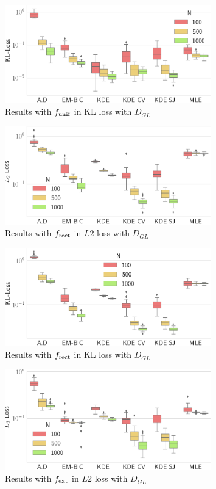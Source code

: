 \begin{figure}
\center
    \includegraphics[width=0.8\textwidth]{./TeX_files/res_uniform_KL_GL.png}
    \caption{Results with $f_{\textnormal{unif}}$ in KL loss with $D_{GL}$}
    \label{fig:res_uniform_KL_GL}
\end{figure}
\begin{figure}
\center
    \includegraphics[width=0.8\textwidth]{./TeX_files/res_rect_L2_GL.png}
    \caption{Results with $f_{\textnormal{rect}}$ in $L2$ loss with $D_{GL}$}
    \label{fig:res_rect_L2_GL}
\end{figure}

\begin{figure}
\center
    \includegraphics[width=0.8\textwidth]{./TeX_files/res_rect_KL_GL.png}
    \caption{Results with $f_{\textnormal{rect}}$ in KL loss with $D_{GL}$}
    \label{fig:res_rect_KL_GL}
\end{figure}   
\begin{figure}
\center
    \includegraphics[width=0.8\textwidth]{./TeX_files/res_lapl_gauss_not_dict_L2_GL.png}
    \caption{Results with $f_{\textnormal{ext}}$ in $L2$ loss with $D_{GL}$}
    \label{fig:res_ext_L2_GL}
\end{figure}

